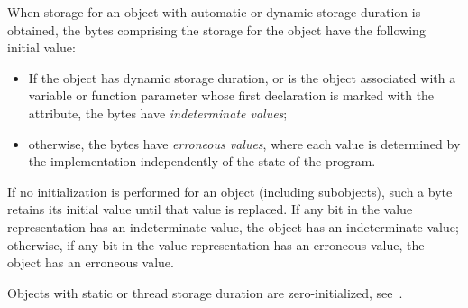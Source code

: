 \begin{adjustwidth}{0.5cm}{0.5cm}
When storage for an object with automatic or dynamic storage duration
is obtained,
the bytes comprising the storage for the object
have the following initial value:
\begin{itemize}
\item
If the object has dynamic storage duration, or
is the object associated with a variable or function parameter
whose first declaration is marked with
the \tcode{[[indeterminate]]} attribute,
the bytes have \emph{indeterminate values};
\item
otherwise, the bytes have \emph{erroneous values},
where each value is determined by the implementation
independently of the state of the program.
\end{itemize}
If no initialization is performed for an object (including subobjects),
such a byte retains its initial value
until that value is replaced.
If any bit in the value representation has an indeterminate value,
the object has an indeterminate value;
otherwise, if any bit in the value representation has an erroneous value,
the object has an erroneous value.

\begin{note}
Objects with static or thread storage duration are zero-initialized,
see~.
\end{note}



\end{adjustwidth}
